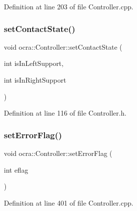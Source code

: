 Definition at line 203 of file Controller.\+cpp.

\hypertarget{classocra_1_1Controller_aa0b365af3cab4a8dc1a3ba3af6a073f0}{}\label{classocra_1_1Controller_aa0b365af3cab4a8dc1a3ba3af6a073f0} 
\subsubsection{\texorpdfstring{set\+Contact\+State()}{setContactState()}}
{\footnotesize\ttfamily void ocra\+::\+Controller\+::set\+Contact\+State (\begin{DoxyParamCaption}\item[{int}]{is\+In\+Left\+Support,  }\item[{int}]{is\+In\+Right\+Support }\end{DoxyParamCaption})\hspace{0.3cm}{\ttfamily [inline]}}



Definition at line 116 of file Controller.\+h.

\hypertarget{classocra_1_1Controller_a36df4135749c17f6d4425fabed37d022}{}\label{classocra_1_1Controller_a36df4135749c17f6d4425fabed37d022} 
\subsubsection{\texorpdfstring{set\+Error\+Flag()}{setErrorFlag()}}
{\footnotesize\ttfamily void ocra\+::\+Controller\+::set\+Error\+Flag (\begin{DoxyParamCaption}\item[{int}]{eflag }\end{DoxyParamCaption})\hspace{0.3cm}{\ttfamily [protected]}}



Definition at line 401 of file Controller.\+cpp.

\hypertarget{classocra_1_1Controller_a3e8c327d25152d457172a65d826c84b4}{}\label{classocra_1_1Controller_a3e8c327d25152d457172a65d826c84b4} 
